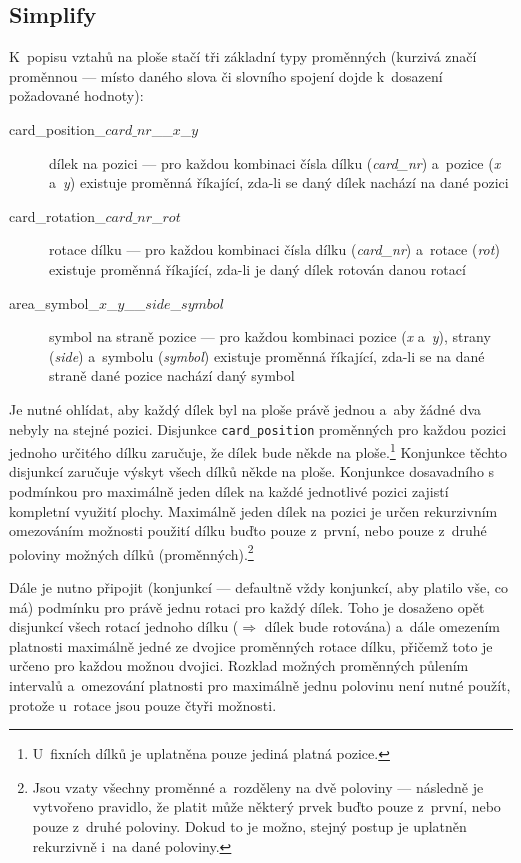 \documentclass[11pt, titlepage]{report}
\begin{document}
\subsection{Simplify}
\label{subsec:sat-et-simplify}

K~popisu vztahů na ploše stačí tři základní typy proměnných (kurzivá značí proměnnou --- místo daného slova či slovního spojení dojde k~dosazení požadované hodnoty):

\begin{description}
\item[card\_position\_$card\_nr$\_\_$x$\_$y$] dílek na pozici --- pro každou kombinaci čísla dílku (\emph{card\_nr}) a~pozice (\emph{x} a~\emph{y}) existuje proměnná říkající, zda-li se daný dílek nachází na dané pozici
\item[card\_rotation\_$card\_nr$\_$rot$] rotace dílku --- pro každou kombinaci čísla dílku (\emph{card\_nr}) a~rotace (\emph{rot}) existuje proměnná říkající, zda-li je daný dílek rotován danou rotací
\item[area\_symbol\_$x$\_$y$\_\_$side$\_$symbol$] symbol na straně pozice --- pro každou kombinaci pozice (\emph{x} a~\emph{y}), strany (\emph{side}) a~symbolu (\emph{symbol}) existuje proměnná říkající, zda-li se na dané straně dané pozice nachází daný symbol
\end{description}

Je nutné ohlídat, aby každý dílek byl na ploše právě jednou a~aby žádné dva nebyly na stejné pozici. Disjunkce \texttt{card\_position} proměnných pro každou pozici jednoho určitého dílku zaručuje, že dílek bude někde na ploše.\footnote{U~fixních dílků je uplatněna pouze jediná platná pozice.} Konjunkce těchto disjunkcí zaručuje výskyt všech dílků někde na ploše. Konjunkce dosavadního s podmínkou pro maximálně jeden dílek na každé jednotlivé pozici zajistí kompletní využití plochy. Maximálně jeden dílek na pozici je určen rekurzivním omezováním možnosti použití dílku buďto pouze z~první, nebo pouze z~druhé poloviny možných dílků (proměnných).\footnote{Jsou vzaty všechny proměnné a~rozděleny na dvě poloviny --- následně je vytvořeno pravidlo, že platit může některý prvek buďto pouze z~první, nebo pouze z~druhé poloviny. Dokud to je možno, stejný postup je uplatněn rekurzivně i~na dané poloviny.}

Dále je nutno připojit (konjunkcí --- defaultně vždy konjunkcí, aby platilo vše, co má) podmínku pro právě jednu rotaci pro každý dílek. Toho je dosaženo opět disjunkcí všech rotací jednoho dílku ($\Rightarrow$ dílek bude rotována) a~dále omezením platnosti maximálně jedné ze dvojice proměnných rotace dílku, přičemž toto je určeno pro každou možnou dvojici. Rozklad možných proměnných půlením intervalů a~omezování platnosti pro maximálně jednu polovinu není nutné použít, protože u~rotace jsou pouze čtyři možnosti.
\end{document}
